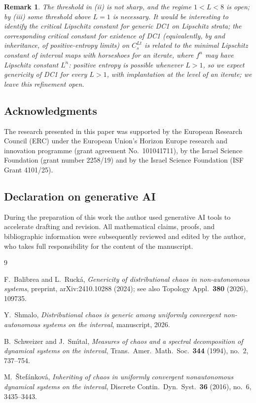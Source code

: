 \documentclass[11pt]{article}
\newtheorem{remark}[theorem]{Remark}
\begin{document}
\begin{remark}
The threshold in (ii) is not sharp, and the regime $1<L<8$ is open; by (iii) some
threshold above $L=1$ is necessary.  It would be interesting to identify the
critical Lipschitz constant for generic DC1 on Lipschitz strata; the
corresponding critical constant for \emph{existence} of DC1 (equivalently, by
\cite{SS} and inheritance, of positive-entropy limits) on $C^{Lt}_s$ is related
to the minimal Lipschitz constant of interval maps with horseshoes for an
iterate, where $f^n$ may have Lipschitz constant $L^n$: positive entropy is
possible whenever $L>1$, so we expect genericity of DC1 for every $L>1$,
with implantation at the level of an iterate; we leave this refinement open.
\end{remark}

\subsection*{Acknowledgments}
The research presented in this paper was supported by the European Research Council
(ERC) under the European Union's Horizon Europe research and innovation programme
(grant agreement No.\ 101041711), by the Israel Science Foundation (grant number
2258/19) and by the Israel Science Foundation (ISF Grant 4101/25).

\subsection*{Declaration on generative AI}
During the preparation of this work the author used generative AI tools to
accelerate drafting and revision.  All mathematical claims, proofs, and
bibliographic information were subsequently reviewed and edited by the author, who
takes full responsibility for the content of the manuscript.

\begin{thebibliography}{9}

F.~Balibrea and L.~Ruck\'a,
\emph{Genericity of distributional chaos in non-autonomous systems},
preprint, arXiv:2410.10288 (2024); see also
Topology Appl.\ \textbf{380} (2026), 109735.

Y.~Shmalo,
\emph{Distributional chaos is generic among uniformly convergent non-autonomous
systems on the interval},
manuscript, 2026.

B.~Schweizer and J.~Sm\'\i tal,
\emph{Measures of chaos and a spectral decomposition of dynamical systems on the
interval},
Trans.\ Amer.\ Math.\ Soc.\ \textbf{344} (1994), no.~2, 737--754.

M.~\v Stef\'ankov\'a,
\emph{Inheriting of chaos in uniformly convergent nonautonomous dynamical systems
on the interval},
Discrete Contin.\ Dyn.\ Syst.\ \textbf{36} (2016), no.~6, 3435--3443.

\end{thebibliography}
\end{document}
